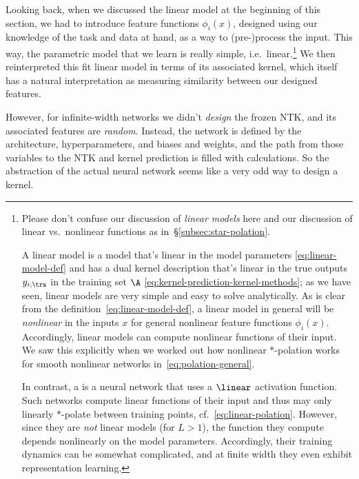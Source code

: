 Looking back, when we discussed the linear model at the beginning of this section, we had to introduce feature functions $\phi_i(x)$, designed using our knowledge of the task and data at hand, as a way to (pre-)process the input. This way, the parametric model that we learn is really simple, i.e.~linear.\footnote{Please don't confuse our discussion of \emph{linear models} here and our discussion of linear vs.~nonlinear functions as in~\S\ref{subsec:star-polation}.

A linear model is a model that's linear in the model parameters \eqref{eq:linear-model-def} and has a dual kernel description that's linear in the true outputs $y_{i;\tra}$ in the training set $\A$ \eqref{eq:kernel-prediction-kernel-methods}; as we have seen, linear models are very simple and easy to solve analytically. As is clear from the definition~\eqref{eq:linear-model-def}, a linear model in general will be \emph{nonlinear} in the inputs $x$ for general nonlinear feature functions $\phi_i(x)$. Accordingly, linear models can compute nonlinear functions of their input. We saw this explicitly when we worked out how nonlinear $\ast$-polation works for smooth nonlinear networks in~\eqref{eq:polation-general}.  

In contrast, a  is a neural network that uses a $\linear$ activation function. Such networks compute linear functions of their input and thus may only linearly $\ast$-polate between training points, cf.~\eqref{eq:linear-polation}. However, since they are \emph{not} linear models (for $L>1$), the function they compute depends nonlinearly on the model parameters. Accordingly, their training dynamics can be somewhat complicated, and at finite width they even exhibit representation learning. %
}
We then reinterpreted this fit linear model in terms of its associated kernel, which itself has a natural interpretation as measuring similarity between our designed features.


However, for infinite-width networks we didn't \emph{design} the frozen NTK, and its associated features are \emph{random}. Instead, the network is defined by the architecture, hyperparameters, and biases and weights, and the path from those variables to the NTK and kernel prediction is filled with calculations. So the abstraction of the actual neural network seems like a very odd way to design a kernel.



